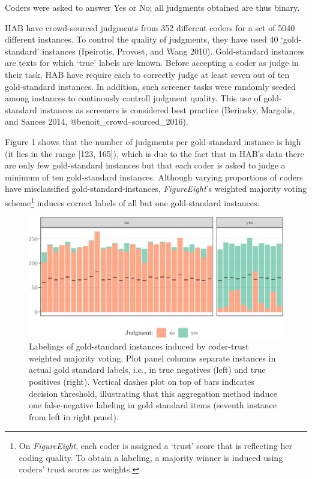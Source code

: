 \documentclass[12pt,]{article}
\begin{document}
Coders were asked to answer Yes or No; all judgments obtained are thus
binary.

HAB have crowd-sourced judgments from 352 different coders for a set of
5040 different instances. To control the quality of judgments, they have
used 40 `gold-standard' instances (Ipeirotis, Provost, and Wang 2010).
Gold-standard instances are texts for which `true' labels are known.
Before accepting a coder as judge in their task, HAB have require each
to correctly judge at least seven out of ten gold-standard instances. In
addition, such screener tasks were randomly seeded among instances to
continously controll judgment quality. This use of gold-standard
instances as screeners is considered best practice (Berinsky, Margolis,
and Sances 2014, @benoit\_crowd--sourced\_2016).

Figure 1 shows that the number of judgments per gold-standard instance
is high (it lies in the range {[}123, 165{]}), which is due to the fact
that in HAB's data there are only few gold-standard instances but that
each coder is asked to judge a minimum of ten gold-standard instances.
Although varying proportions of coders have misclassified
gold-standard-instances, \emph{FigureEight}'s weighted majority voting
scheme\footnote{On \emph{FigureEight}, each coder is assigned a `trust'
  score that is reflecting her coding quality. To obtain a labeling, a
  majority winner is induced using coders' trust scores as weights.}
induces correct labels of all but one gold-standard instances.

\begin{figure}[H]

{\centering \includegraphics{licht_2019_evaluating_crowdsourced_elite_critique_codings_files/figure-latex/goldstandard_voted_labeling-1} 

}

\caption{Labelings of gold-standard instances induced by coder-trust weighted majority voting. Plot panel columns separate instances in actual gold standard labels, i.e., in true negatives (left) and true positives (right). Vertical dashes plot on top of bars indicates decision threshold, illustrating that this aggregation method induce one false-negative labeling in gold standard items (seventh instance from left in right panel).}\label{fig:goldstandard_voted_labeling}
\end{figure}
\end{document}
